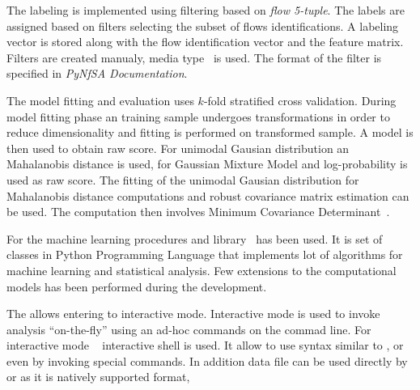 The labeling is implemented using filtering based on \emph{flow 5-tuple}.
The labels are assigned based on filters selecting the subset of flows identifications.
A labeling vector is stored along with the flow identification vector and the feature matrix.
Filters are created manualy,  media type~\cite{crockford2006application} is used. The format of the 
filter is specified in \emph{PyNfSA Documentation}.

The model fitting and evaluation uses $k$-fold stratified cross validation. 
During model fitting phase an training sample undergoes transformations in order to reduce dimensionality
and fitting is performed on transformed sample. A model is then used to obtain raw score.
For unimodal Gausian distribution an Mahalanobis distance is used, for Gaussian Mixture Model and
log-probability is used as raw score. The fitting of the unimodal Gausian distribution  for 
Mahalanobis distance computations and robust covariance matrix estimation can be used. 
The  computation then involves Minimum Covariance Determinant~\cite{rousseeuw1984least}.

For the machine learning procedures and  library~\cite{pedregosa2011scikit} has been used.
It is set of classes in Python Programming Language that implements lot of algorithms for
machine learning and statistical analysis. Few extensions to the computational models has been 
performed during the  development.

The  allows entering to interactive mode. Interactive mode is used to invoke analysis
``on-the-fly'' using an ad-hoc commands on the commad line. For interactive mode ~\cite{iPython} 
interactive shell  is  used. It allow to use syntax similar to , 
 or even  by invoking special commands. In addition  data file
can be used directly by  or  as it is natively supported format,



